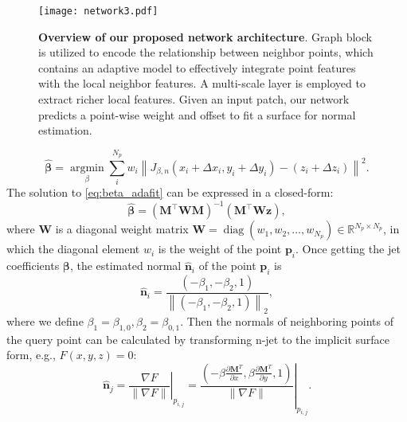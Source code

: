 \documentclass[runningheads]{llncs}
\begin{document}
\begin{figure*}[t]
  \centering
   \texttt{[image: network3.pdf]}
   \caption{\textbf{Overview of our proposed network architecture}. Graph block is utilized to encode the relationship between neighbor points, which contains an adaptive model to effectively integrate point features with the local neighbor features. A multi-scale layer is employed to extract richer local features. Given an input patch, our network predicts a point-wise weight and offset to fit a surface for normal estimation.}
   \label{fig:network}
\end{figure*}
\begin{equation}
\hat{\boldsymbol{\beta}}=\underset{\beta}{\operatorname{argmin}} \sum_{i}^{N_{p}} w_{i}\left\|J_{\beta, n}\left(x_{i}+\Delta x_{i}, y_{i}+\Delta y_{i}\right)-\left(z_{i}+\Delta z_{i}\right)\right\|^{2}.
\label{eq:beta_adafit}
\end{equation}
The solution to \cref{eq:beta_adafit} can be expressed in a closed-form:
\begin{equation}
\hat{\boldsymbol{\beta}}=\left(\mathbf{M}^{\top} \mathbf{W} \mathbf{M}\right)^{-1}\left(\mathbf{M}^{\top} \mathbf{W} \mathbf{z}\right),
\label{eq:beta_solu}
\end{equation}
where $\mathbf{W}$ is a diagonal weight matrix $\mathbf{W}=\operatorname{diag}\left(w_{1}, w_{2}, \ldots, w_{N_{p}}\right) \in \mathbb{R}^{N_{p} \times N_{p}}$, in which the diagonal element $w_{i}$ is the weight of the point $\mathbf{p}_{i}$. Once getting the jet coefficients $\boldsymbol{\beta}$, the estimated normal $\hat{\mathbf{n}}_i$ of the point $\mathbf{p}_{i}$ is
\begin{equation}
\hat{\mathbf{n}}_i=\frac{\left(-\beta_{1},-\beta_{2}, 1\right)}{\left\|\left(-\beta_{1},-\beta_{2}, 1\right)\right\|_{2}},
\label{eq:normal}
\end{equation}
where we define $\beta_{1} = {\beta}_{1, 0}, \beta_{2} = {\beta}_{0, 1}$. Then the normals of neighboring points of the query point can be calculated by transforming n-jet to the implicit surface form, e.g., $F\left(x, y, z\right) = 0$: 
\begin{equation}
\hat{\mathbf{n}}_{j}=\left.\frac{\nabla F}{\|\nabla F\|}\right|_{p_{i, j}}=\left.\frac{\left(-\beta \frac{\partial \mathbf{M}^{T}}{\partial x}, \beta \frac{\partial \mathbf{M}^{T}}{\partial y}, 1\right)}{\|\nabla F\|}\right|_{p_{i, j}}.
\end{equation}
\end{document}
